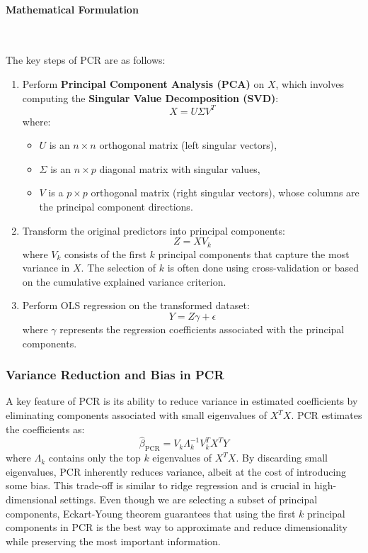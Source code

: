 \documentclass[11pt,twoside,a4paper]{article}
\begin{document}
\paragraph{Mathematical Formulation} \ \

The key steps of PCR are as follows:

\begin{enumerate}
    \item Perform \textbf{Principal Component Analysis (PCA)} on \( X \), which involves computing the \textbf{Singular Value Decomposition (SVD)}:
    \[
    X = U \Sigma V^T
    \]
    where:
    \begin{itemize}
        \item \( U \) is an \( n \times n \) orthogonal matrix (left singular vectors),
        \item \( \Sigma \) is an \( n \times p \) diagonal matrix with singular values,
        \item \( V \) is a \( p \times p \) orthogonal matrix (right singular vectors), whose columns are the principal component directions.
    \end{itemize}
    
    \item Transform the original predictors into principal components:
    \[
    Z = X V_k
    \]
    where \( V_k \) consists of the first \( k \) principal components that capture the most variance in \( X \). The selection of \( k \) is often done using cross-validation or based on the cumulative explained variance criterion.

    \item Perform OLS regression on the transformed dataset:
    \[
    Y = Z \gamma + \epsilon
    \]
    where \( \gamma \) represents the regression coefficients associated with the principal components.
  \end{enumerate}

\subsubsection{Variance Reduction and Bias in PCR}
A key feature of PCR is its ability to reduce variance in estimated coefficients by eliminating components associated with small eigenvalues of \( X^T X \). PCR estimates the coefficients as:
\[
\hat{\beta}_{\text{PCR}} = V_k \Lambda_k^{-1} V_k^T X^T Y
\]
where \( \Lambda_k \) contains only the top \( k \) eigenvalues of \( X^T X \). By discarding small eigenvalues, PCR inherently reduces variance, albeit at the cost of introducing some bias. This trade-off is similar to ridge regression and is crucial in high-dimensional settings. Even though we are selecting a subset of principal components, Eckart-Young theorem guarantees that using the first \( k \) principal components in PCR is the best way to approximate and reduce dimensionality while preserving the most important information.
\end{document}
